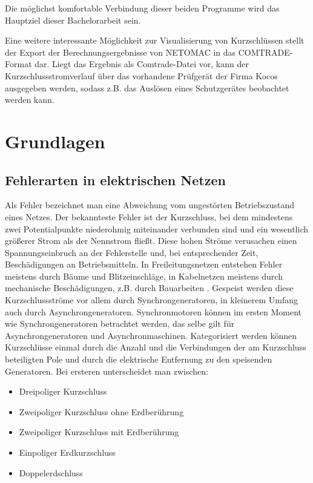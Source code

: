 \documentclass{scrartcl}
\begin{document}
\begin{onehalfspace}
Die möglichst komfortable Verbindung dieser beiden Programme wird das Hauptziel dieser Bachelorarbeit sein.

Eine weitere interessante Möglichkeit zur Visualisierung von Kurzschlüssen stellt der Export der Berechnungsergebnisse von NETOMAC in das COMTRADE-Format dar. Liegt das Ergebnis als Comtrade-Datei vor, kann der Kurzschlussstromverlauf über das vorhandene Prüfgerät der Firma Kocos ausgegeben werden, sodass z.B. das Auslösen eines Schutzgerätes beobachtet werden kann.

\section{Grundlagen}


\subsection{Fehlerarten in elektrischen Netzen}
Als Fehler bezeichnet man eine Abweichung vom ungestörten Betriebszustand eines Netzes. Der bekannteste Fehler ist der Kurzschluss, bei dem mindestens zwei Potentialpunkte niederohmig miteinander verbunden sind und ein wesentlich größerer Strom als der Nennstrom fließt. Diese hohen Ströme verusachen einen Spannungseinbruch an der Fehlerstelle und, bei entsprechender Zeit, Beschädigungen an Betriebsmitteln. In Freileitungsnetzen entstehen Fehler meistens durch Bäume und Blitzeinschläge, in Kabelnetzen meistens durch mechanische Beschädigungen, z.B. durch Bauarbeiten \cite[S. 57]{Pistora2013}. Gespeist werden diese Kurzschlussströme vor allem durch Synchrongeneratoren, in kleinerem Umfang auch durch Asynchrongeneratoren. Synchronmotoren können im ersten Moment wie Synchrongeneratoren betrachtet werden, das selbe gilt für Asynchrongeneratoren und Asynchronmaschinen. Kategorisiert werden können Kurzschlüsse einmal durch die Anzahl und die Verbindungen der am Kurzschluss beteiligten Pole und durch die elektrische Entfernung zu den speisenden Generatoren. Bei ersteren unterscheidet man zwischen:

\begin{itemize}
\item Dreipoliger Kurzschluss
\item Zweipoliger Kurzschluss ohne Erdberührung
\item Zweipoliger Kurzschluss mit Erdberührung
\item Einpoliger Erdkurzschluss
\item Doppelerdschluss
\end{itemize}


\end{onehalfspace}
\end{document}
